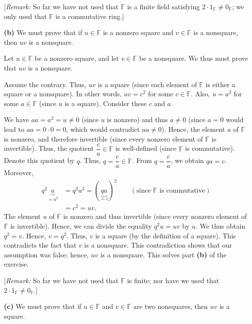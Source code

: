 \documentclass[paper=a4, fontsize=12pt]{scrartcl}%
\theoremstyle{plainsl}
\theoremstyle{definition}
\theoremstyle{remark}
\begin{document}
[\textit{Remark:} So far we have not used that $\mathbb{F}$ is a finite field
satisfying $2\cdot1_{\mathbb{F}}\neq0_{\mathbb{F}}$; we only used that
$\mathbb{F}$ is a commutative ring.]

\bigskip

\textbf{(b)} We must prove that if $u\in\mathbb{F}$ is a nonzero square and
$v\in\mathbb{F}$ is a nonsquare, then $uv$ is a nonsquare.

Let $u\in\mathbb{F}$ be a nonzero square, and let $v\in\mathbb{F}$ be a
nonsquare. We thus must prove that $uv$ is a nonsquare.

Assume the contrary. Thus, $uv$ is a square (since each element of
$\mathbb{F}$ is either a square or a nonsquare). In other words, $uv=c^{2}$
for some $c\in\mathbb{F}$. Also, $u=a^{2}$ for some $a\in\mathbb{F}$ (since
$u$ is a square). Consider these $c$ and $a$.

We have $aa=a^{2}=u\neq0$ (since $u$ is nonzero) and thus $a\neq0$ (since
$a=0$ would lead to $aa=0\cdot0=0$, which would contradict $aa\neq0$). Hence,
the element $a$ of $\mathbb{F}$ is nonzero, and therefore invertible (since
every nonzero element of $\mathbb{F}$ is invertible). Thus, the quotient
$\dfrac{c}{a}\in\mathbb{F}$ is well-defined (since $\mathbb{F}$ is
commutative). Denote this quotient by $q$. Thus, $q=\dfrac{c}{a}\in\mathbb{F}%
$. From $q=\dfrac{c}{a}$, we obtain $qa=c$. Moreover,%
\begin{align*}
q^{2}\underbrace{u}_{=a^{2}}  &  =q^{2}a^{2}=\left(  \underbrace{qa}%
_{=c}\right)  ^{2}\qquad\left(  \text{since }\mathbb{F}\text{ is
commutative}\right) \\
&  =c^{2}=uv.
\end{align*}
The element $u$ of $\mathbb{F}$ is nonzero and thus invertible (since every
nonzero element of $\mathbb{F}$ is invertible). Hence, we can divide the
equality $q^{2}u=uv$ by $u$. We thus obtain $q^{2}=v$. Hence, $v=q^{2}$. Thus,
$v$ is a square (by the definition of a square). This contradicts the fact
that $v$ is a nonsquare. This contradiction shows that our assumption was
false; hence, $uv$ is a nonsquare. This solves part \textbf{(b)} of the exercise.

[\textit{Remark:} So far we have not used that $\mathbb{F}$ is finite; nor
have we used that $2\cdot1_{\mathbb{F}}\neq0_{\mathbb{F}}$.]

\bigskip

\textbf{(c)} We must prove that if $u\in\mathbb{F}$ and $v\in\mathbb{F}$ are
two nonsquares, then $uv$ is a square.
\end{document}
